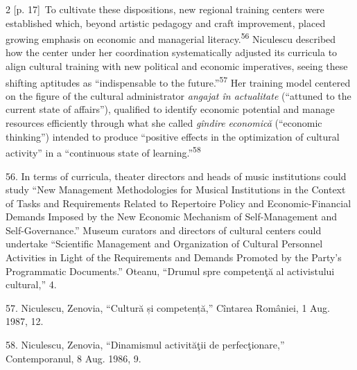 \documentclass[10pt,a4paper]{article}
\begin{document}
\begin{paracol}{2}
\switchcolumn
{\scriptsize\color{gray} [p. 17]}\ To cultivate these dispositions, new regional training centers were established which, beyond artistic pedagogy and craft improvement, placed growing emphasis on economic and managerial literacy.\nobreak\textsuperscript{56} Niculescu described how the center under her coordination systematically adjusted its curricula to align cultural training with new political and economic imperatives, seeing these shifting aptitudes as “indispensable to the future.”\nobreak\textsuperscript{57} Her training model centered on the figure of the cultural administrator \textit{angajat în actualitate} (“attuned to the current state of affairs”), qualified to identify economic potential and manage resources efficiently through what she called \textit{gîndire economică} (“economic thinking”) intended to produce “positive effects in the optimization of cultural activity” in a “continuous state of learning.”\nobreak\textsuperscript{58}\par{\small 56. In terms of curricula, theater directors and heads of music institutions could study “New Management Methodologies for Musical Institutions in the Context of Tasks and Requirements Related to Repertoire Policy and Economic-Financial Demands Imposed by the New Economic Mechanism of Self-Management and Self-Governance.” Museum curators and directors of cultural centers could undertake “Scientific Management and Organization of Cultural Personnel Activities in Light of the Requirements and Demands Promoted by the Party’s Programmatic Documents.” Oteanu, “Drumul spre competenţă al activistului cultural,” 4.\par}{\small 57. Niculescu, Zenovia, “Cultură și competență,” Cîntarea României, 1 Aug. 1987, 12.\par}{\small 58. Niculescu, Zenovia, “Dinamismul activităţii de perfecţionare,” Contemporanul, 8 Aug. 1986, 9.\par}
\switchcolumn*

\end{paracol}
\end{document}
